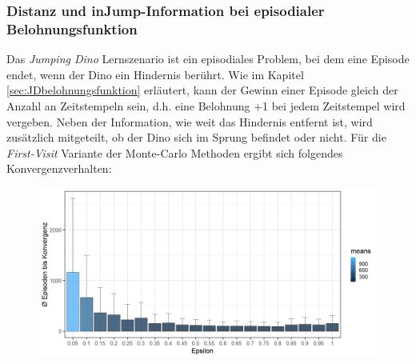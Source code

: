 \subsubsection*{Distanz und \glqq inJump\grqq{}-Information bei episodialer Belohnungsfunktion}
Das \textit{Jumping Dino} Lernszenario ist ein episodiales Problem, bei dem eine Episode endet, wenn der Dino ein Hindernis berührt. Wie im Kapitel \ref{sec:JDbelohnungsfunktion} erläutert, kann der Gewinn einer Episode gleich der Anzahl an Zeitstempeln sein, d.h. eine Belohnung +1 bei jedem Zeitstempel wird vergeben. Neben der Information, wie weit das Hindernis entfernt ist, wird zusätzlich mitgeteilt, ob der Dino sich im Sprung befindet oder nicht.
\newpage
 Für die \textit{First-Visit} Variante der Monte-Carlo Methoden ergibt sich folgendes Konvergenzverhalten:

\begin{figure}[H]
    \centering
    \includegraphics[width=\textwidth]{images/SimpleZ2B1MonteCarloA}
    \label{fig:test1}
\end{figure}

